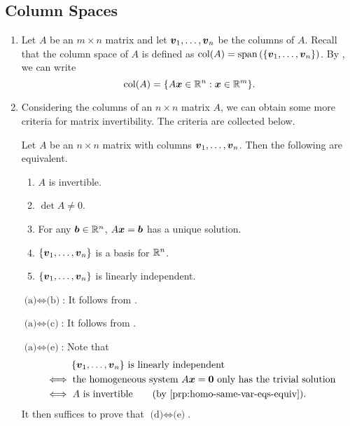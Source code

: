 \subsection{Column Spaces}
\label{subsect:col-sp}
\begin{enumerate}
\item Let \(A\) be an \(m\times n\) matrix and let
\(\vb*{v}_1,\dotsc,\vb*{v}_n\) be the columns of \(A\). Recall that the
column space of \(A\) is defined as
\(\operatorname{col}(A)=\operatorname{span}\qty(\{\vb*{v}_1,\dotsc,\vb*{v}_n\})\). By
, we can write
\[
\operatorname{col}(A)=\{A\vb*{x}\in\mathbb{R}^n:\vb*{x}\in\mathbb{R}^m\}.
\]
\item Considering the columns of an \(n\times n\) matrix \(A\), we can obtain
some more criteria for matrix invertibility. The criteria are collected below.

\begin{theorem}
\label{thm:matx-inv-crit}
Let \(A\) be an \(n\times  n\) matrix with columns
\(\vb*{v}_1,\dotsc,\vb*{v}_n\). Then the following are equivalent.
\begin{enumerate}
\item \(A\) is invertible.
\item \(\det A\ne 0\).
\item For any \(\vb*{b}\in\mathbb{R}^n\), \(A\vb*{x}=\vb*{b}\) has a unique solution.
\item \(\{\vb*{v}_1,\dotsc,\vb*{v}_n\}\) is a basis for \(\mathbb{R}^n\).
\item \(\{\vb*{v}_1,\dotsc,\vb*{v}_n\}\) is linearly independent.
\end{enumerate}
\end{theorem}
\begin{pf}
\underline{\(\text{(a)}\iff\text{(b)}\)}: It follows from .

\underline{\(\text{(a)}\iff\text{(c)}\)}: It follows from .

\underline{\(\text{(a)}\iff\text{(e)}\)}: Note that
\begin{align*}
&\hspace{1cm}\text{\(\{\vect{v}_1,\dotsc,\vect{v}_n\}\) is linearly independent}\\
&\iff \text{the homogeneous system \(A\vect{x}=\vect{0}\) only has the trivial solution} \\
&\iff \text{\(A\) is invertible\qquad (by \Cref{prp:homo-same-var-eqs-equiv})}.
\end{align*}
It then suffices to prove that \(\text{(d)}\iff\text{(e)}\).


\end{pf}
\end{enumerate}
